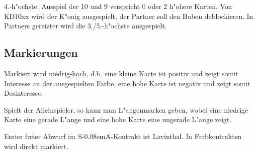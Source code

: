 \documentclass[11pt,german,twocolumn]{scrartcl}
\def\sa{\textsf{S\kern-0.08emA}}
\begin{document}
4.-h"ochste. Ausspiel der 10 und 9 verspricht 0 oder 2 h"ohere Karten. Von
KD10xx wird der K"onig ausgespielt, der Partner soll den Buben deblockieren. In
Partners gereizter wird die 3./5.-h"ochste ausgespielt.

\subsection{Markierungen}

Markiert wird niedrig-hoch, d.h. eine kleine Karte ist positiv und zeigt somit
Interesse an der ausgespielten Farbe, eine hohe Karte ist negativ und zeigt
somit Desinteresse.

Spielt der Alleinspieler, so kann man L"angenmarken geben, wobei eine niedrige
Karte eine gerade L"ange und eine hohe Karte eine ungerade L"ange zeigt.

Erster freier Abwurf im \sa-Kontrakt ist Lavinthal. In Farbkontrakten wird
direkt markiert.
\end{document}
